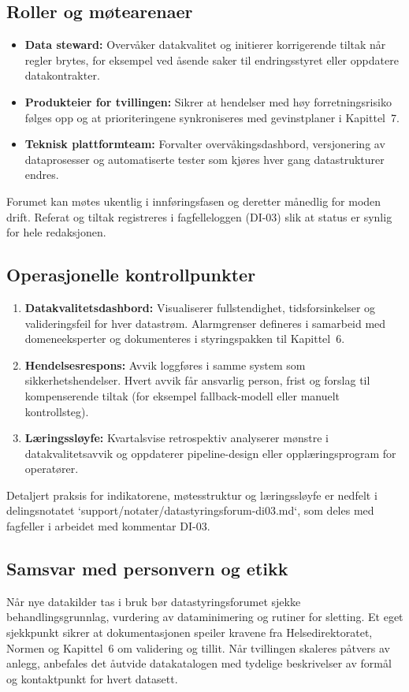 \subsection{Roller og m\o tearenaer}
\begin{itemize}
    \item \textbf{Data steward:} Overv\aa ker datakvalitet og initierer korrigerende tiltak n\aa r regler brytes, for eksempel ved \aa sende saker til endringsstyret eller oppdatere datakontrakter.
    \item \textbf{Produkteier for tvillingen:} Sikrer at hendelser med h\o y forretningsrisiko f\o lges opp og at prioriteringene synkroniseres med gevinstplaner i Kapittel~7.
    \item \textbf{Teknisk plattformteam:} Forvalter overv\aa kingsdashbord, versjonering av dataprosesser og automatiserte tester som kj\o res hver gang datastrukturer endres.
\end{itemize}
Forumet kan m\o tes ukentlig i innf\o ringsfasen og deretter m\aa nedlig for moden drift. Referat og tiltak registreres i fagfelleloggen (DI-03) slik at status er synlig for hele redaksjonen.

\subsection{Operasjonelle kontrollpunkter}
\begin{enumerate}
    \item \textbf{Datakvalitetsdashbord:} Visualiserer fullstendighet, tidsforsinkelser og valideringsfeil for hver datastr\o m. Alarmgrenser defineres i samarbeid med domeneeksperter og dokumenteres i styringspakken til Kapittel~6.
    \item \textbf{Hendelsesrespons:} Avvik loggf\o res i samme system som sikkerhetshendelser. Hvert avvik f\aa r ansvarlig person, frist og forslag til kompenserende tiltak (for eksempel fallback-modell eller manuelt kontrollsteg).
    \item \textbf{L\ae ringssl\o yfe:} Kvartalsvise retrospektiv analyserer m\o nstre i datakvalitetsavvik og oppdaterer pipeline-design eller oppl\ae ringsprogram for operat\o rer.
\end{enumerate}
Detaljert praksis for indikatorene, m\o tesstruktur og l\ae ringssl\o yfe er nedfelt i delingsnotatet `support/notater/datastyringsforum-di03.md`,
som deles med fagfeller i arbeidet med kommentar DI-03.

\subsection{Samsvar med personvern og etikk}
N\aa r nye datakilder tas i bruk b\o r datastyringsforumet sjekke behandlingsgrunnlag, vurdering av dataminimering og rutiner for sletting. Et eget sjekkpunkt sikrer at dokumentasjonen speiler kravene fra Helsedirektoratet, Normen og Kapittel~6 om validering og tillit. N\aa r tvillingen skaleres p\aa tvers av anlegg, anbefales det \aa utvide datakatalogen med tydelige beskrivelser av form\aa l og kontaktpunkt for hvert datasett.

